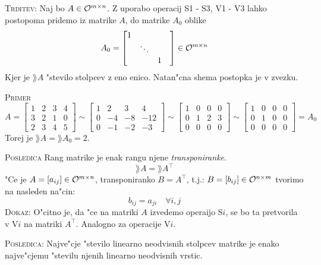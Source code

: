 \textsc{Trditev:} Naj bo $A \in \mathcal{O}^{m \times n}$. Z uporabo operacij S1 - S3, V1 - V3 lahko postopoma pridemo iz matrike $A$, do matrike $A_0$ oblike
\begin{equation*}
A_0 = \begin{bmatrix}
1 &  &  &  \\
 & \ddots &  & \\
 &  & 1 & 
\end{bmatrix} \in \mathcal{O}^{m \times n}
\end{equation*}
Kjer je $\rang A$ "stevilo stolpcev z eno enico. Natan"cna shema postopka je v zvezku.

\textsc{Primer}
\begin{equation*}
A = \begin{bmatrix}
1 & 2 & 3 & 4 \\
3 & 2 & 1 & 0 \\
2 & 3 & 4 & 5
\end{bmatrix} \sim
\begin{bmatrix}
1 & 2 & 3 & 4 \\
0 & -4 & -8 & -12 \\
0 & -1 & -2 & -3
\end{bmatrix} \sim
\begin{bmatrix}
1 & 0 & 0 & 0 \\
0 & 1 & 2 & 3 \\
0 & 0 & 0 & 0
\end{bmatrix} \sim
\begin{bmatrix}
1 & 0 & 0 & 0 \\
0 & 1 & 0 & 0 \\
0 & 0 & 0 & 0
\end{bmatrix} = A_0
\end{equation*}
Torej je $\rang A = \rang A_0 = 2$.

\textsc{Posledica} Rang matrike je enak rangu njene \emph{transponiranke}.
\begin{equation*}
\rang A = \rang A^\intercal
\end{equation*}
"Ce je $A = [a_{ij}] \in \mathcal{O}^{m \times n}$, transponiranko $B = A^\intercal$, t.j.: $B = [b_{ij}] \in \mathcal{O}^{n \times m}$ tvorimo na nasleden na"cin:
\begin{equation*}
b_{ij} = a_{ji} \quad \forall i, j
\end{equation*}
\textsc{Dokaz:} O"citno je, da "ce na matriki $A$ izvedemo operaijo S$i$, se bo ta pretvorila v V$i$ na matriki $A^\intercal$. Analogno za operacije V$i$.

\textsc{Posledica:} Najve"cje "stevilo linearno neodvisnih stolpcev matrike je enako najve"cjemu "stevilu njenih linearno neodvisnih vrstic.

